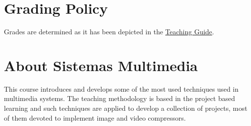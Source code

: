 \section{Grading Policy}
Grades are determined as it has been depicted in the
\href{https://www.ual.es/estudios/masteres/presentacion/plandeestudios/asignatura/7114/71142105}{Teaching
  Guide}.

  
\section{About Sistemas Multimedia}

This course introduces and develops some of the most used techniques
used in multimedia systems. The teaching methodology is based in the
project based learning and such techniques are applied to develop a
collection of projects, most of them devoted to implement image and
video compressors.



